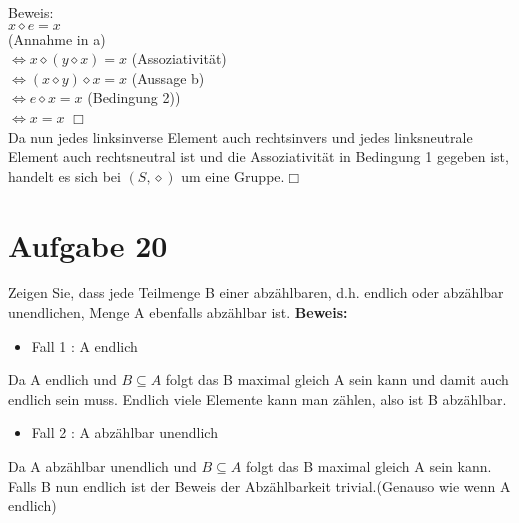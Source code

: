 \documentclass[paper = a4, ngerman]{scrartcl}
\begin{document}
Beweis:\\
$x \diamond e = x$\\ \hspace{10mm} (Annahme in a)\\
$\Leftrightarrow x \diamond (y \diamond x ) = x$ \hspace{10mm} (Assoziativität)\\ 
$\Leftrightarrow (x \diamond y) \diamond x  = x$ \hspace{10mm} (Aussage b)\\ 
$\Leftrightarrow e \diamond x  = x$ \hspace{10mm} (Bedingung 2))\\ 
$\Leftrightarrow x  = x$ \hfill$\Box$\\

Da nun jedes linksinverse Element auch rechtsinvers und jedes linksneutrale Element auch rechtsneutral ist und die Assoziativität in Bedingung 1 gegeben ist, handelt es sich bei $(S, \diamond)$ um eine Gruppe.\hfill$\Box$\\


	
	
\section*{Aufgabe 20}
Zeigen Sie, dass jede Teilmenge B einer abzählbaren, d.h. endlich oder abzählbar unendlichen, Menge A ebenfalls abzählbar ist.
\textbf{Beweis:}
\begin{itemize}
	\item Fall 1 : A endlich
\end{itemize}
Da A endlich und $B \subseteq A$  folgt das B maximal gleich A sein kann und damit auch endlich sein muss. Endlich viele Elemente kann man zählen, also ist B abzählbar.
\begin{itemize}
	\item Fall 2 : A abzählbar unendlich
\end{itemize}
Da A abzählbar unendlich und $B \subseteq A$  folgt das B maximal gleich A sein kann.\\
Falls B nun endlich ist der Beweis der Abzählbarkeit trivial.(Genauso wie wenn A endlich)\\
\end{document}
